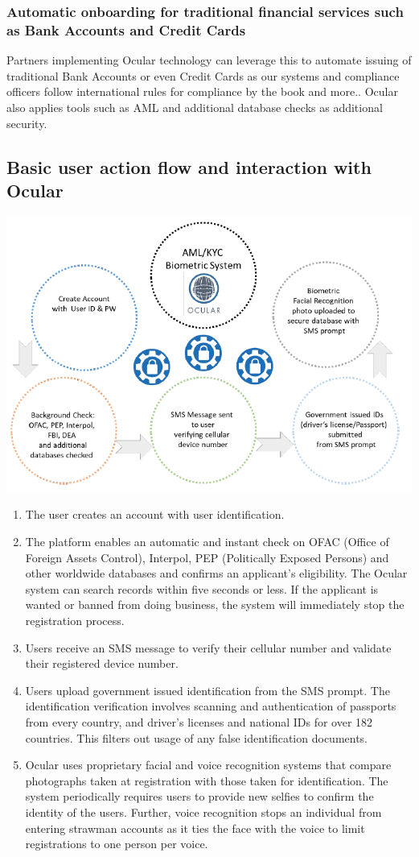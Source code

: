\documentclass[a4paper]{article}
\begin{document}
\subsubsection*{Automatic onboarding for traditional financial services such as Bank Accounts and Credit Cards}
Partners implementing Ocular technology can leverage this to automate issuing of traditional Bank Accounts or even Credit Cards as our systems and compliance officers follow international rules for compliance by the book and more.. Ocular also applies tools such as AML and additional database checks as additional security.


\clearpage
\subsection{Basic user action flow and interaction with Ocular}
\centerline{\includegraphics[width=1.1\textwidth]{biometric}}
\begin{enumerate}
\item The user creates an account with user identification.
\item The platform enables an automatic and instant check on OFAC (Office of Foreign Assets Control), Interpol, PEP (Politically Exposed Persons) and other worldwide databases and confirms an applicant’s eligibility. The Ocular system can search records within five seconds or less. If the applicant is wanted or banned from doing business, the system will immediately stop the registration process.
\item Users receive an SMS message to verify their cellular number and validate their registered device number.
\item Users upload government issued identification from the SMS prompt. The identification verification involves scanning and authentication of passports from every country, and driver's licenses and national IDs for over 182 countries. This filters out usage of any false identification documents.
\item Ocular uses proprietary facial and voice recognition systems that compare photographs taken at registration with those taken for identification. The system periodically requires users to provide new selfies to confirm the identity of the users. Further, voice recognition stops an individual from entering strawman accounts as it ties the face with the voice to limit registrations to one person per voice.
\end{enumerate}
\end{document}
